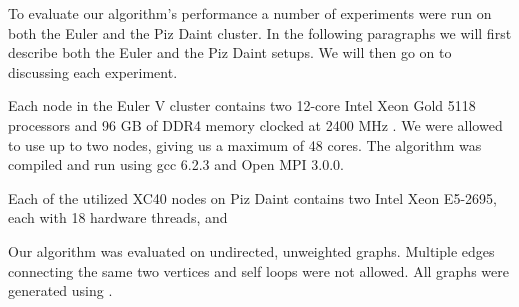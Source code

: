 To evaluate our algorithm's performance a number of experiments were run on both the Euler and the
Piz Daint cluster. In the following paragraphs we will first describe both the Euler and the Piz
Daint setups. We will then go on to discussing each experiment.

Each node in the Euler V cluster contains two 12-core Intel Xeon Gold 5118 processors and 96 GB of
DDR4 memory clocked at 2400 MHz \cite{Euler}. We were allowed to use up to two nodes, giving us a
maximum of 48 cores. The algorithm was compiled and run using gcc 6.2.3 and Open MPI 3.0.0.

Each of the utilized XC40 nodes on Piz Daint contains two Intel Xeon E5-2695, each with 18 hardware threads,
and

Our algorithm was evaluated on undirected, unweighted graphs. Multiple edges connecting the same
two vertices and self loops were not allowed. All graphs were generated using \cite{Parmat}.



